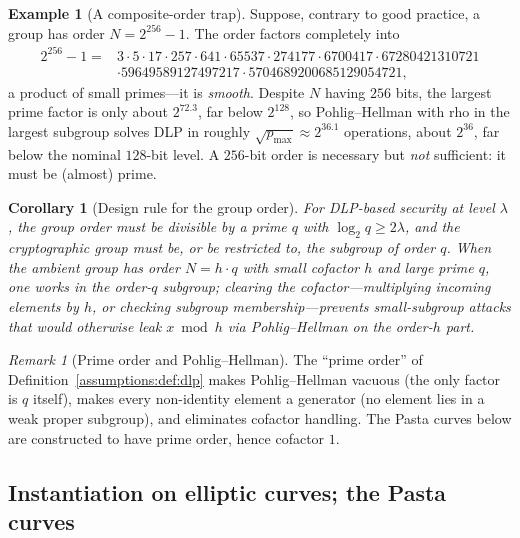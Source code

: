 \documentclass[11pt,a4paper]{article}
\newtheorem{corollary}[theorem]{Corollary}
\theoremstyle{definition}
\newtheorem{example}[theorem]{Example}
\theoremstyle{remark}
\newtheorem{remark}[theorem]{Remark}
\begin{document}
\begin{example}[A composite-order trap]
\label{assumptions:exa:smooth}
Suppose, contrary to good practice, a group has order
\(N = 2^{256} - 1\). The order factors completely into
\begin{align*}
2^{256} - 1 ={}& 3 \cdot 5 \cdot 17 \cdot 257 \cdot 641 \cdot 65537
  \cdot 274177 \cdot 6700417 \cdot 67280421310721 \\
&\cdot 59649589127497217 \cdot 5704689200685129054721,
\end{align*}
a product of small primes---it is \emph{smooth}. Despite \(N\) having
\(256\) bits, the largest prime factor is only about \(2^{72.3}\),
far below \(2^{128}\), so Pohlig--Hellman with rho in the largest
subgroup solves DLP in roughly
\(\sqrt{p_{\max}} \approx 2^{36.1}\) operations, about \(2^{36}\),
far below the nominal \(128\)-bit level. A \(256\)-bit order is
necessary but \emph{not} sufficient: it must be (almost) prime.
\end{example}

\begin{corollary}[Design rule for the group order]
\label{assumptions:cor:large-prime}
For DLP-based security at level \(\lambda\), the group order must be
divisible by a prime \(q\) with \(\log_2 q \ge 2\lambda\), and the
cryptographic group must be, or be restricted to, the subgroup of
order \(q\). When the ambient group has order \(N = h \cdot q\) with
small \emph{cofactor} \(h\) and large prime \(q\), one works in the
order-\(q\) subgroup; clearing the cofactor---multiplying incoming
elements by \(h\), or checking subgroup membership---prevents
small-subgroup attacks that would otherwise leak \(x \bmod h\) via
Pohlig--Hellman on the order-\(h\) part.
\end{corollary}

\begin{remark}[Prime order and Pohlig--Hellman]
\label{assumptions:rem:cofactor}
The ``prime order'' of Definition~\ref{assumptions:def:dlp} makes
Pohlig--Hellman vacuous
(the only factor is \(q\) itself), makes every non-identity element a
generator (no element lies in a weak proper subgroup), and eliminates
cofactor handling. The Pasta curves below are constructed to have prime
order, hence cofactor \(1\).
\end{remark}

\subsection{Instantiation on elliptic curves; the Pasta curves}
\label{assumptions:subsec:pasta}
\end{document}
